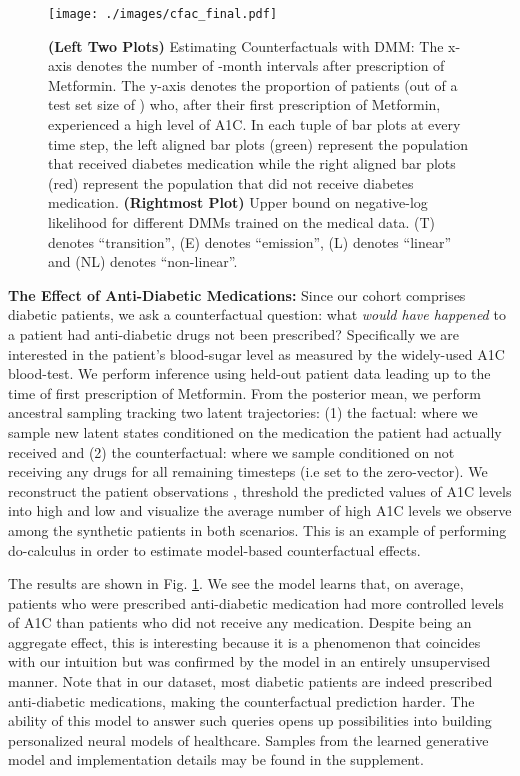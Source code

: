 \documentclass[letterpaper]{article}
\theoremstyle{plain}
\newcommand{\DKF}{DMM\xspace}
\begin{document}
{\begin{figure}[t!]
	\centering
	\texttt{[image: ./images/cfac\_final.pdf]}
	\caption{\small {\bf (Left Two Plots) } 
	Estimating Counterfactuals with \DKF:  The x-axis denotes the number of -month intervals after prescription of Metformin. 
		The y-axis denotes the proportion of patients (out of a test set size of ) who, after their first prescription of Metformin, experienced
	a high level of A1C. In each tuple of bar plots at every time step, the left aligned bar plots (green) represent the population that received diabetes
medication while the right aligned bar plots (red) represent the population that did not receive diabetes medication.
{\bf (Rightmost Plot) } Upper bound on negative-log likelihood for different DMMs trained on the medical data. (T) denotes ``transition'', (E) denotes ``emission'', (L) denotes ``linear'' and (NL) denotes ``non-linear''. 
}
	\label{fig:cfac}
\end{figure}
\textbf{The Effect of Anti-Diabetic Medications: } 
Since our cohort comprises diabetic patients, we ask a counterfactual question: what \emph{would 
have happened} to a patient had anti-diabetic drugs not been prescribed? Specifically we are interested in the patient's blood-sugar level as measured by the widely-used A1C blood-test.
We perform inference using held-out patient data leading up to the time  of first prescription of Metformin.
From the posterior mean, we perform ancestral sampling tracking two latent trajectories: 
(1) the factual: where we sample new latent states conditioned 
on the medication  the patient had actually received and 
(2) the counterfactual: where we sample conditioned on 
not receiving any drugs for all remaining timesteps (i.e  set to the zero-vector). 
We reconstruct the patient observations , threshold
the predicted values of A1C levels into high and low and visualize the average number of high A1C levels 
we observe among the synthetic patients in both scenarios. 
This is an example of performing do-calculus \cite{pearl2009causality} in order to estimate model-based counterfactual effects.

The results are shown in Fig. \ref{fig:cfac}. We see the model learns that, on average, patients who were prescribed anti-diabetic medication
had more controlled levels of A1C than patients who did not receive any medication.  
Despite being an aggregate effect, this is interesting because it is a phenomenon that coincides with our intuition
but was confirmed by the model in an entirely unsupervised manner. Note that in our dataset, most diabetic patients are indeed prescribed anti-diabetic medications, making the counterfactual prediction harder. The ability of this model to answer such
queries opens up possibilities into building personalized neural models of healthcare. 
Samples from the learned generative model
and implementation details may be found in the supplement. 

}
\end{document}
